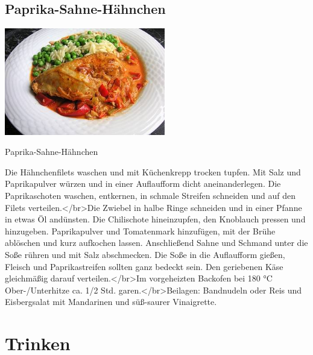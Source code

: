 \documentclass[12pt]{book}
\begin{document}
\begin{multicols}{2}
\begin{mytextbox}
  \section{Paprika-Sahne-Hähnchen}



  \begin{center}
    \includegraphics[width=7cm]{8d3eb2e33142426fff48e29184626861}
  \end{center}


  \begin{center}
    Paprika-Sahne-Hähnchen
  \end{center}

  Die Hähnchenfilets waschen und mit Küchenkrepp trocken tupfen. Mit Salz und Paprikapulver würzen und in einer Auflaufform dicht aneinanderlegen. Die Paprikaschoten waschen, entkernen, in schmale Streifen schneiden und auf den Filets verteilen.</br>Die Zwiebel in halbe Ringe schneiden und in einer Pfanne in etwas Öl andünsten. Die Chilischote hineinzupfen, den Knoblauch pressen und hinzugeben. Paprikapulver und Tomatenmark hinzufügen, mit der Brühe ablöschen und kurz aufkochen lassen. Anschließend Sahne und Schmand unter die Soße rühren und mit Salz abschmecken. Die Soße in die Auflaufform gießen, Fleisch und Paprikastreifen sollten ganz bedeckt sein. Den geriebenen Käse gleichmäßig darauf verteilen.</br>Im vorgeheizten Backofen bei 180 °C Ober-/Unterhitze ca. 1/2 Std. garen.</br>Beilagen: Bandnudeln oder Reis und Eisbergsalat mit Mandarinen und süß-saurer Vinaigrette.

\end{mytextbox}	\end{multicols}
\newpage
  \chapter{Trinken}
\begin{mytextbox}
\end{mytextbox}
\newpage
\end{document}

